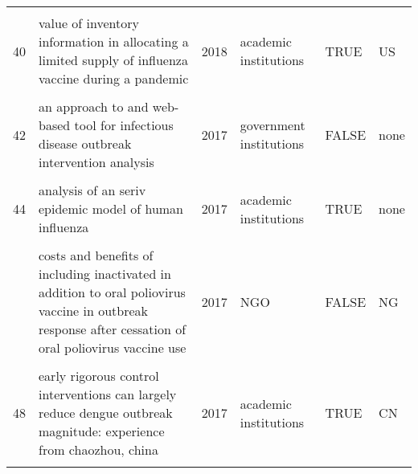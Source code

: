 \documentclass[
]{article}
\begin{document}
\begin{landscape}
\begin{longtable}{l>{\raggedright\arraybackslash}p{4cm}l>{\raggedright\arraybackslash}p{3.5cm}l>{\raggedright\arraybackslash}p{1.5cm}}
\cellcolor{gray!6}{39} & \cellcolor{gray!6}{the potential impact of case-area targeted interventions in response to cholera outbreaks: a modeling study} & \cellcolor{gray!6}{2018} & \cellcolor{gray!6}{academic institutions + government institutions + NGO} & \cellcolor{gray!6}{FALSE} & \cellcolor{gray!6}{TD}\\
40 & value of inventory information in allocating a limited supply of influenza vaccine during a pandemic & 2018 & academic institutions & TRUE & US\\
\addlinespace
\cellcolor{gray!6}{41} & \cellcolor{gray!6}{an age-structured model for cholera control with vaccination} & \cellcolor{gray!6}{2017} & \cellcolor{gray!6}{academic institutions} & \cellcolor{gray!6}{TRUE} & \cellcolor{gray!6}{none}\\
42 & an approach to and web-based tool for infectious disease outbreak intervention analysis & 2017 & government institutions & FALSE & none\\
\cellcolor{gray!6}{43} & \cellcolor{gray!6}{an economic assessment of foot and mouth disease in japan} & \cellcolor{gray!6}{2017} & \cellcolor{gray!6}{government institutions} & \cellcolor{gray!6}{FALSE} & \cellcolor{gray!6}{JP}\\
44 & analysis of an seriv epidemic model of human influenza & 2017 & academic institutions & TRUE & none\\
\cellcolor{gray!6}{45} & \cellcolor{gray!6}{control strategies of avian influenza pandemic model with time delay} & \cellcolor{gray!6}{2017} & \cellcolor{gray!6}{academic institutions} & \cellcolor{gray!6}{TRUE} & \cellcolor{gray!6}{none}\\
\addlinespace
46 & costs and benefits of including inactivated in addition to oral poliovirus vaccine in outbreak response after cessation of oral poliovirus vaccine use & 2017 & NGO & FALSE & NG\\
\cellcolor{gray!6}{47} & \cellcolor{gray!6}{deriving effective vaccine allocation strategies for pandemic influenza: comparison of an agent-based simulation and a compartmental model} & \cellcolor{gray!6}{2017} & \cellcolor{gray!6}{academic institutions + government institutions} & \cellcolor{gray!6}{FALSE} & \cellcolor{gray!6}{US}\\
48 & early rigorous control interventions can largely reduce dengue outbreak magnitude: experience from chaozhou, china & 2017 & academic institutions & TRUE & CN\\
\cellcolor{gray!6}{49} & \cellcolor{gray!6}{effects of reactive social distancing on the 1918 influenza pandemic} & \cellcolor{gray!6}{2017} & \cellcolor{gray!6}{academic institutions} & \cellcolor{gray!6}{TRUE} & \cellcolor{gray!6}{GB}\\

\end{longtable}
\end{landscape}
\end{document}

